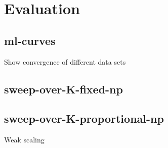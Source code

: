 \section{Evaluation}

\subsection{ml-curves}
Show convergence of different data sets
\begin{figure}[t] %
  \centering
  \label{fig-ppx-cpu}
\end{figure}

\begin{figure}[t] %
  \centering
  \label{fig-ppx-cpu}
\end{figure}

  \begin{figure}[t] %
  \centering
  \label{fig-ppx-cpu}
\end{figure}

\begin{figure}[t] %
  \centering
  \label{fig-ppx-cpu}
\end{figure}

\begin{figure}[t] %
  \centering
  \label{fig-ppx-cpu}
\end{figure}

\subsection{sweep-over-K-fixed-np}
\begin{figure}[t] %
  \centering
  \label{fig-ppx-cpu}
\end{figure}



\subsection{sweep-over-K-proportional-np}
Weak scaling

\begin{figure}[t] %
  \centering
  \label{fig-ppx-cpu}
\end{figure}

